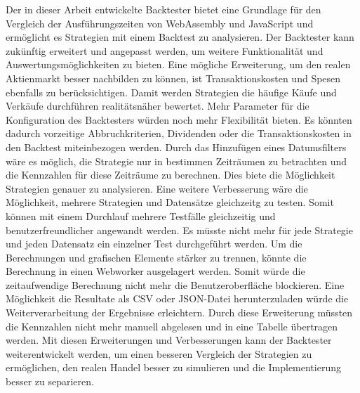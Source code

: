 Der in dieser Arbeit entwickelte Backtester bietet eine Grundlage für den Vergleich der Ausführungszeiten von WebAssembly und JavaScript und ermöglicht es Strategien mit einem Backtest zu analysieren.
Der Backtester kann zukünftig erweitert und angepasst werden, um weitere Funktionalität und Auswertungsmöglichkeiten zu bieten.
\newline
Eine mögliche Erweiterung, um den realen Aktienmarkt besser nachbilden zu können, ist Transaktionskosten und Spesen ebenfalls zu berücksichtigen.
Damit werden Strategien die häufige Käufe und Verkäufe durchführen realitätsnäher bewertet.
Mehr Parameter für die Konfiguration des Backtesters würden noch mehr Flexibilität bieten.
Es könnten dadurch vorzeitige Abbruchkriterien, Dividenden oder die Transaktionskosten in den Backtest miteinbezogen werden.
\newline
Durch das Hinzufügen eines Datumsfilters wäre es möglich, die Strategie nur in bestimmen Zeiträumen zu betrachten und die Kennzahlen für diese Zeiträume zu berechnen.
Dies biete die Möglichkeit Strategien genauer zu analysieren.
\newline
Eine weitere Verbesserung wäre die Möglichkeit, mehrere Strategien und Datensätze gleichzeitg zu testen.
Somit können mit einem Durchlauf mehrere Testfälle gleichzeitig und benutzerfreundlicher angewandt werden.
Es müsste nicht mehr für jede Strategie und jeden Datensatz ein einzelner Test durchgeführt werden.
\newline
Um die Berechnungen und grafischen Elemente stärker zu trennen, könnte die Berechnung in einen Webworker ausgelagert werden.
Somit würde die zeitaufwendige Berechnung nicht mehr die Benutzeroberfläche blockieren.
\newline
Eine Möglichkeit die Resultate als CSV oder JSON-Datei herunterzuladen würde die Weiterverarbeitung der Ergebnisse erleichtern.
Durch diese Erweiterung müssten die Kennzahlen nicht mehr manuell abgelesen und in eine Tabelle übertragen werden.
\newline
Mit diesen Erweiterungen und Verbesserungen kann der Backtester weiterentwickelt werden, um einen besseren Vergleich der Strategien zu ermöglichen, den realen Handel besser zu simulieren und die Implementierung besser zu separieren.